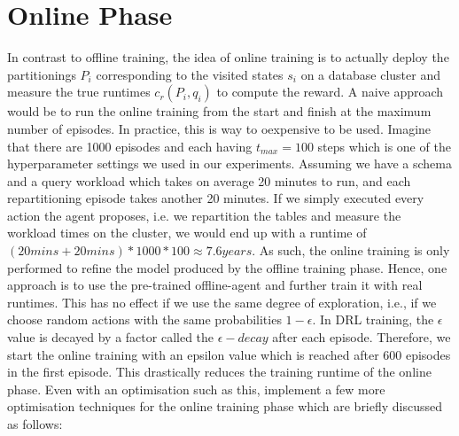 \section{Online Phase}
\label{sec:online-training}
In contrast to offline training, the idea of online training is to actually deploy the partitionings $P_i$ corresponding to the visited states $s_i$ on a database cluster and measure the true runtimes $c_r(P_i,q_i)$ to compute the reward. A naive approach would be to run the online training from the start and finish at the maximum number of episodes. In practice, this is way to oexpensive to be used. Imagine that there are 1000 episodes and each having $t_{max}=100$ steps which is one of the hyperparameter settings we used in our experiments. Assuming we have a schema and a query workload which takes on average 20 minutes to run, and each repartitioning episode takes another 20 minutes. If we simply executed every action the agent proposes, i.e. we repartition the tables and measure the workload times on the cluster, we would end up with a runtime of $(20 \textit{mins} + 20 \textit{mins})*1000*100 \approx 7.6 \textit{years}$. As such, the online training is only performed to refine the model produced by the offline training phase. Hence, one approach is to use the pre-trained offline-agent and further train it with real runtimes. This has no effect if we use the same degree of exploration, i.e., if we choose random actions with the same probabilities $1-\epsilon$. In DRL training, the $\epsilon$ value is decayed by a factor called the $\epsilon-\textit{decay}$ after each episode. Therefore, we start the online training with an epsilon value which is reached after 600 episodes in the first episode. This drastically reduces the training runtime of the online phase. Even with an optimisation such as this, \citeauthor{Hilprecht:2019:TLP:3329859.3329876} implement a few more optimisation techniques for the online training phase which are briefly discussed as follows:
